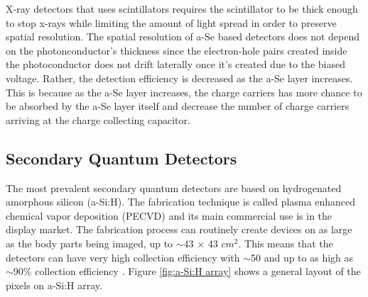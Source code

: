 
X-ray detectors that uses scintillators requires the scintillator to be thick enough to stop x-rays while limiting the amount of light spread in order to preserve spatial resolution.  The spatial resolution of a-Se based detectors does not depend on the photonconductor's thickness since the electron-hole pairs created inside the photoconductor does not drift laterally once it's created due to the biased voltage.  Rather, the detection efficiency is decreased as the a-Se layer increases.  This is because as the a-Se layer increases,  the charge carriers has more chance to be absorbed by the a-Se layer itself and decrease the number of charge carriers arriving at the charge collecting capacitor.

\subsection{Secondary Quantum Detectors}
The most prevalent secondary quantum detectors are based on hydrogenated amorphous silicon (a-Si:H).  The fabrication technique is called plasma enhanced chemical vapor deposition (PECVD) and its main commercial use is in the display market.  The fabrication process can routinely create devices on as large as the body parts being imaged, up to $\sim$43 $\times$ 43 $cm^2$.  This means that the detectors can have very high collection efficiency with $\sim$50 and up to as high as $\sim$90$\%$ collection efficiency \cite{yorkston2007}.
Figure \ref{fig:a-Si:H array} shows a general layout of the pixels on a-Si:H array.  

